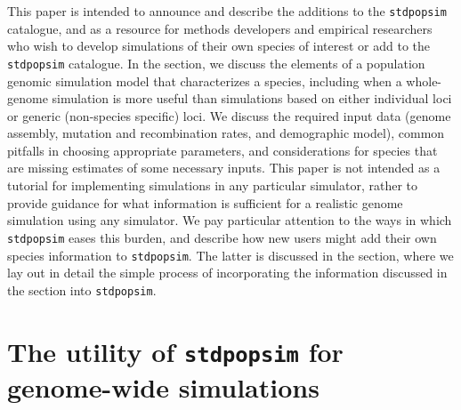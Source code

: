 \documentclass[hidelinks]{article}
\newcommand{\stdpopsim}{\texttt{stdpopsim}\xspace}
\begin{document}
This paper is intended to announce and describe the additions to the \stdpopsim catalogue,
and as a resource for methods developers and empirical researchers
who wish to develop simulations of their own species of interest
or add to the \stdpopsim catalogue.
In the  section,
we discuss the elements of a
population genomic simulation model that characterizes a
species, including when a whole-genome simulation is more useful than
simulations based on either individual loci or generic (non-species specific) loci.
We discuss the required input data (genome assembly,
mutation and recombination rates, and demographic model),
common pitfalls in choosing appropriate parameters, and
considerations for species that are missing estimates of some
necessary inputs. This paper is not intended as a tutorial for
implementing simulations in any particular simulator, rather to provide
guidance for what information is sufficient for a realistic genome simulation
using any simulator. We pay particular attention to the ways
in which \stdpopsim eases this burden, and describe how new users might
add their own species information to \stdpopsim.
The latter is discussed in the  section, where we lay out in
detail the simple process of incorporating the information discussed
in the  section into \stdpopsim.



\section*{The utility of \stdpopsim for genome-wide simulations}
    \label{sec:std-sim}
\end{document}
